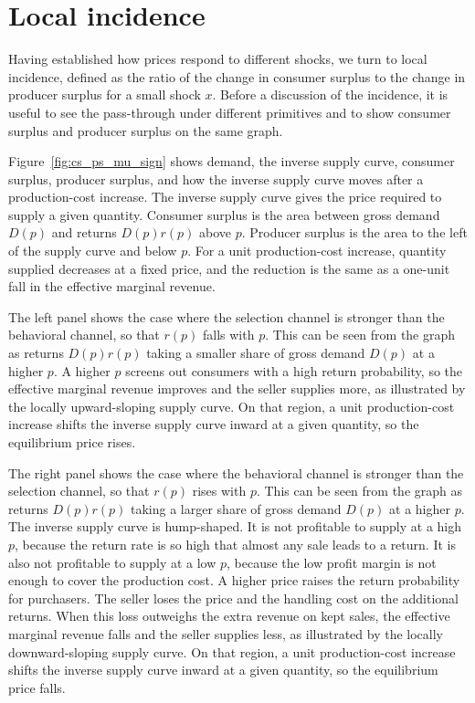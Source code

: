 \documentclass[11pt]{article}
\begin{document}
\section{Local incidence}

Having established how prices respond to different shocks, we turn to
local incidence, defined as the ratio of the change in consumer
surplus to the change in producer surplus for a small shock $x$. Before a
discussion of the incidence, it is useful to see the pass-through under
different primitives and to show consumer surplus and producer surplus
on the same graph.

Figure~\ref{fig:cs_ps_mu_sign} shows demand, the inverse supply curve,
consumer surplus, producer surplus, and how the inverse supply curve
moves after a production-cost increase. The inverse supply curve gives
the price required to supply a given quantity. Consumer surplus is the
area between gross demand $D(p)$ and returns $D(p)r(p)$ above $p$.
Producer surplus is the area to the left of the supply curve and below
$p$. For a unit production-cost increase, quantity
supplied decreases at a fixed price, and the reduction is the same as a
one-unit fall in the effective marginal revenue.

The left panel shows the case where the selection channel
is stronger than the behavioral channel, so that $r(p)$ falls with $p$. This
can be seen from the graph as returns $D(p)r(p)$ taking a smaller share of
gross demand $D(p)$ at a higher $p$. A higher $p$ screens out consumers with a high return probability,
so the effective marginal revenue improves and the seller supplies more,
as illustrated by the locally upward-sloping supply curve.
On that region, a unit production-cost increase shifts the
inverse supply curve inward at a given quantity, so the equilibrium
price rises.

The right panel shows the case where the behavioral channel
is stronger than the selection channel, so that $r(p)$ rises with $p$.
This can be seen from the graph as returns $D(p)r(p)$ taking a larger share
of gross demand $D(p)$ at a higher $p$. The inverse supply curve is hump-shaped.
It is not profitable to supply at a high $p$, because the return rate is so
high that almost any sale leads to a return. It is also not profitable to
supply at a low $p$, because the low profit margin is not enough to cover
the production cost. A higher price raises the return
probability for purchasers. The seller loses the price and the handling
cost on the additional returns. When this loss outweighs the extra revenue
on kept sales, the effective marginal revenue falls and the seller supplies
less, as illustrated by the locally downward-sloping supply curve.
On that region, a unit production-cost increase shifts the inverse supply curve
inward at a given quantity, so the equilibrium price falls.
\end{document}
